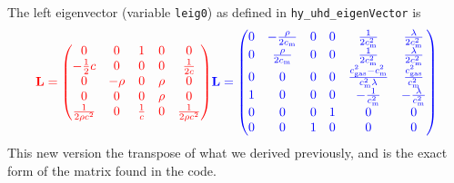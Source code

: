 \documentclass[preprint,11pt]{aastex}
\newcommand{\beq}{\begin{equation}}
\newcommand{\eeq}{\end{equation}}
\begin{document}
The left eigenvector (variable \verb!leig0!)  as defined in \verb!hy_uhd_eigenVector! is
\beq
{\color{red}
\mathbf{L} = 
\begin{pmatrix}
0 & 0 & 1 & 0 & 0 \\
-\frac{1}{2} c & 0 & 0 & 0 & \frac{1}{2 c} \\
0 & -\rho & 0 & \rho & 0 \\
0 & 0 & 0 & \rho & 0 \\
\frac{1}{2 \rho c^2} & 0 & \frac{1}{c} & 0 & \frac{1}{2 \rho c^2}
\end{pmatrix}
}
{\color{blue}
\mathbf{L} = 
\begin{pmatrix}
0 & -\frac{\rho}{2c_{\rm m}} & 0 & 0 & \frac{1}{2 c_{\rm m}^2} & \frac{\lambda}{2 c_{\rm m}^2} \\
0 & \frac{\rho}{2 c_{\rm m}} & 0 & 0 & \frac{1}{2 c_{\rm m}^2} & \frac{\lambda}{2 c_{\rm m}^2} \\
0 & 0 & 0 & 0 & \frac{c_{\rm gas}^2 - c_{\rm m}^2}{c_{\rm m}^2 \lambda} & \frac{c_{\rm gas}^2}{c_{\rm m}^2} \\
1 & 0 & 0 & 0 & -\frac{1}{c_{\rm m}^2} & -\frac{\lambda}{c_{\rm m}^2} \\ 
0 & 0 & 0 & 1 & 0 & 0 \\
0 & 0 & 1 & 0 & 0 & 0
\end{pmatrix}
}
\eeq
{\color{blue} This new version the transpose of what we derived previously, and is the exact form of the matrix found in the code.}
\end{document}
